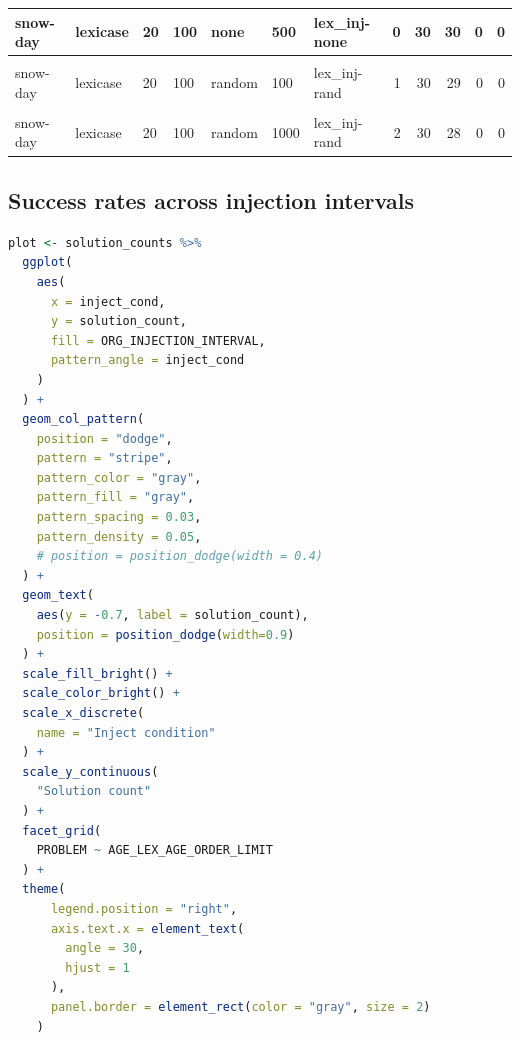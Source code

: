 \documentclass[
]{book}
\begin{document}
\begin{table}
\begin{tabular}{l|l|l|l|l|l|l|r|r|r|r|r}
\hline
snow-day & lexicase & 20 & 100 & none & 500 & lex\_inj-none & 0 & 30 & 30 & 0 & 0\\
\hline
\cellcolor{gray!6}{snow-day} & \cellcolor{gray!6}{lexicase} & \cellcolor{gray!6}{20} & \cellcolor{gray!6}{100} & \cellcolor{gray!6}{none} & \cellcolor{gray!6}{1000} & \cellcolor{gray!6}{lex\_inj-none} & \cellcolor{gray!6}{0} & \cellcolor{gray!6}{30} & \cellcolor{gray!6}{30} & \cellcolor{gray!6}{0} & \cellcolor{gray!6}{0}\\
\hline
snow-day & lexicase & 20 & 100 & random & 100 & lex\_inj-rand & 1 & 30 & 29 & 0 & 0\\
\hline
\cellcolor{gray!6}{snow-day} & \cellcolor{gray!6}{lexicase} & \cellcolor{gray!6}{20} & \cellcolor{gray!6}{100} & \cellcolor{gray!6}{random} & \cellcolor{gray!6}{500} & \cellcolor{gray!6}{lex\_inj-rand} & \cellcolor{gray!6}{1} & \cellcolor{gray!6}{30} & \cellcolor{gray!6}{29} & \cellcolor{gray!6}{0} & \cellcolor{gray!6}{0}\\
\hline
snow-day & lexicase & 20 & 100 & random & 1000 & lex\_inj-rand & 2 & 30 & 28 & 0 & 0\\
\hline
\end{tabular}
\endgroup{}
\end{table}

\hypertarget{success-rates-across-injection-intervals}{%
\subsection{Success rates across injection intervals}\label{success-rates-across-injection-intervals}}

\begin{lstlisting}[language=R]
plot <- solution_counts %>%
  ggplot(
    aes(
      x = inject_cond,
      y = solution_count,
      fill = ORG_INJECTION_INTERVAL,
      pattern_angle = inject_cond
    )
  ) +
  geom_col_pattern(
    position = "dodge",
    pattern = "stripe",
    pattern_color = "gray",
    pattern_fill = "gray",
    pattern_spacing = 0.03,
    pattern_density = 0.05,
    # position = position_dodge(width = 0.4)
  ) +
  geom_text(
    aes(y = -0.7, label = solution_count),
    position = position_dodge(width=0.9)
  ) +
  scale_fill_bright() +
  scale_color_bright() +
  scale_x_discrete(
    name = "Inject condition"
  ) +
  scale_y_continuous(
    "Solution count"
  ) +
  facet_grid(
    PROBLEM ~ AGE_LEX_AGE_ORDER_LIMIT
  ) +
  theme(
      legend.position = "right",
      axis.text.x = element_text(
        angle = 30,
        hjust = 1
      ),
      panel.border = element_rect(color = "gray", size = 2)
    )
\end{lstlisting}
\end{document}

